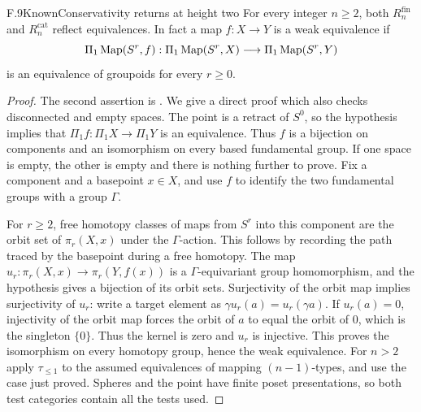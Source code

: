 \begin{claim}{F.9}{Known}{Conservativity returns at height two}
For every integer $n\geq2$, both $R_n^{\mathrm{fin}}$ and
$R_n^{\mathrm{cat}}$ reflect equivalences. In fact a map
$f:X\to Y$ is a weak equivalence if
\[
 \Pi_1\operatorname{Map}(S^r,f):\Pi_1\operatorname{Map}(S^r,X)
             \longrightarrow\Pi_1\operatorname{Map}(S^r,Y)
\]
is an equivalence of groupoids for every $r\geq0$.
\end{claim}
\begin{proof}
The second assertion is
\citet[Theorem~4.3]{ArlinChristensen2023}. We give a direct proof
which also checks disconnected and empty spaces. The point is a
retract of $S^0$, so the hypothesis implies that
$\Pi_1 f:\Pi_1X\to\Pi_1Y$ is an equivalence. Thus $f$ is a
bijection on components and an isomorphism on every based
fundamental group. If one space is empty, the other is empty and
there is nothing further to prove. Fix a component and a basepoint
$x\in X$, and use $f$ to identify the two fundamental groups with
a group $\Gamma$.

For $r\geq2$, free homotopy classes of maps from $S^r$ into this
component are the orbit set of $\pi_r(X,x)$ under the
$\Gamma$-action. This follows by recording the path traced by
the basepoint during a free homotopy. The map
$u_r:\pi_r(X,x)\to\pi_r(Y,f(x))$ is a
$\Gamma$-equivariant group homomorphism, and the hypothesis gives
a bijection of its orbit sets. Surjectivity of the orbit map
implies surjectivity of $u_r$: write a target element as
$\gamma u_r(a)=u_r(\gamma a)$. If $u_r(a)=0$, injectivity of the
orbit map forces the orbit of $a$ to equal the orbit of $0$,
which is the singleton $\{0\}$. Thus the kernel is zero and
$u_r$ is injective. This proves the isomorphism on every
homotopy group, hence the weak equivalence. For $n>2$ apply
$\tau_{\leq1}$ to the assumed equivalences of mapping
$(n-1)$-types, and use the case just proved. Spheres and the
point have finite poset presentations, so both test categories
contain all the tests used.
\end{proof}

